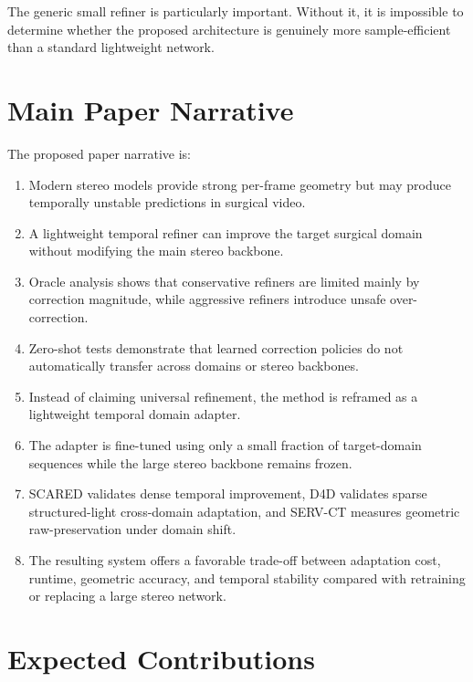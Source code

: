 \documentclass[11pt,a4paper]{article}
\begin{document}
The generic small refiner is particularly important. Without it, it is impossible
to determine whether the proposed architecture is genuinely more sample-efficient
than a standard lightweight network.

\section{Main Paper Narrative}

The proposed paper narrative is:

\begin{enumerate}[leftmargin=*]
    \item Modern stereo models provide strong per-frame geometry but may produce
    temporally unstable predictions in surgical video.

    \item A lightweight temporal refiner can improve the target surgical domain
    without modifying the main stereo backbone.

    \item Oracle analysis shows that conservative refiners are limited mainly by
    correction magnitude, while aggressive refiners introduce unsafe
    over-correction.

    \item Zero-shot tests demonstrate that learned correction policies do not
    automatically transfer across domains or stereo backbones.

    \item Instead of claiming universal refinement, the method is reframed as a
    lightweight temporal domain adapter.

    \item The adapter is fine-tuned using only a small fraction of target-domain
    sequences while the large stereo backbone remains frozen.

    \item SCARED validates dense temporal improvement, D4D validates sparse
    structured-light cross-domain adaptation, and SERV-CT measures geometric
    raw-preservation under domain shift.

    \item The resulting system offers a favorable trade-off between adaptation
    cost, runtime, geometric accuracy, and temporal stability compared with
    retraining or replacing a large stereo network.
\end{enumerate}

\section{Expected Contributions}
\end{document}
